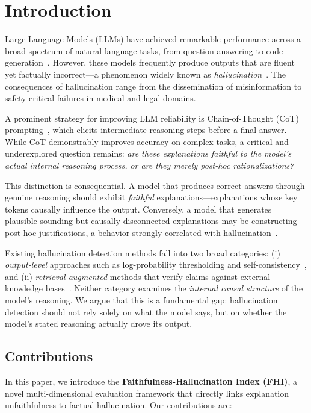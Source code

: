 \section{Introduction}
\label{sec:intro}

Large Language Models (LLMs) have achieved remarkable performance across a broad spectrum of natural language tasks, from question answering to code generation~\cite{brown2020language, touvron2023llama}. However, these models frequently produce outputs that are fluent yet factually incorrect---a phenomenon widely known as \textit{hallucination}~\cite{ji2023survey}. The consequences of hallucination range from the dissemination of misinformation to safety-critical failures in medical and legal domains.

A prominent strategy for improving LLM reliability is Chain-of-Thought (CoT) prompting~\cite{wei2022chain}, which elicits intermediate reasoning steps before a final answer. While CoT demonstrably improves accuracy on complex tasks, a critical and underexplored question remains: \textit{are these explanations faithful to the model's actual internal reasoning process, or are they merely post-hoc rationalizations?}

This distinction is consequential. A model that produces correct answers through genuine reasoning should exhibit \textit{faithful} explanations---explanations whose key tokens causally influence the output. Conversely, a model that generates plausible-sounding but causally disconnected explanations may be constructing post-hoc justifications, a behavior strongly correlated with hallucination~\cite{turpin2023language}.

Existing hallucination detection methods fall into two broad categories: (i) \textit{output-level} approaches such as log-probability thresholding and self-consistency~\cite{wang2022self}, and (ii) \textit{retrieval-augmented} methods that verify claims against external knowledge bases~\cite{lewis2020retrieval}. Neither category examines the \textit{internal causal structure} of the model's reasoning. We argue that this is a fundamental gap: hallucination detection should not rely solely on what the model says, but on whether the model's stated reasoning actually drove its output.

\subsection{Contributions}

In this paper, we introduce the \textbf{Faithfulness-Hallucination Index (FHI)}, a novel multi-dimensional evaluation framework that directly links explanation unfaithfulness to factual hallucination. Our contributions are:

